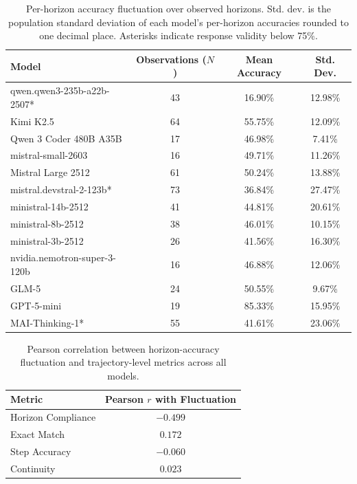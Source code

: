 \documentclass{article}
\begin{document}
\begin{table}[H]
\centering
\caption{Per-horizon accuracy fluctuation over observed horizons. Std. dev. is the population standard deviation of each model's per-horizon accuracies rounded to one decimal place. Asterisks indicate response validity below 75\%.}
\label{tab:horizon_fluctuation}
\scriptsize
\begin{tabular}{lccc}
\toprule
\textbf{Model} & \textbf{Observations ($N$)} & \textbf{Mean Accuracy} & \textbf{Std. Dev.} \\
\midrule
qwen.qwen3-235b-a22b-2507* & 43 & 16.90\% & 12.98\% \\
Kimi K2.5 & 64 & 55.75\% & 12.09\% \\
Qwen 3 Coder 480B A35B & 17 & 46.98\% & 7.41\% \\
mistral-small-2603 & 16 & 49.71\% & 11.26\% \\
Mistral Large 2512 & 61 & 50.24\% & 13.88\% \\
mistral.devstral-2-123b* & 73 & 36.84\% & 27.47\% \\
ministral-14b-2512 & 41 & 44.81\% & 20.61\% \\
ministral-8b-2512 & 38 & 46.01\% & 10.15\% \\
ministral-3b-2512 & 26 & 41.56\% & 16.30\% \\
nvidia.nemotron-super-3-120b & 16 & 46.88\% & 12.06\% \\
GLM-5 & 24 & 50.55\% & 9.67\% \\
GPT-5-mini & 19 & 85.33\% & 15.95\% \\
MAI-Thinking-1* & 55 & 41.61\% & 23.06\% \\
\bottomrule
\end{tabular}
\end{table}

\begin{table}[H]
\centering
\caption{Pearson correlation between horizon-accuracy fluctuation and trajectory-level metrics across all models.}
\label{tab:fluctuation_correlations}
\footnotesize
\begin{tabular}{lc}
\toprule
\textbf{Metric} & \textbf{Pearson $r$ with Fluctuation} \\
\midrule
Horizon Compliance & $-0.499$ \\
Exact Match & $0.172$ \\
Step Accuracy & $-0.060$ \\
Continuity & $0.023$ \\
\bottomrule
\end{tabular}
\end{table}
\end{document}
